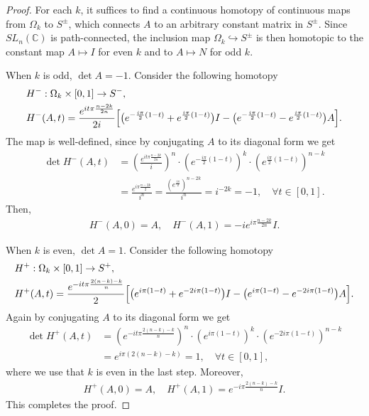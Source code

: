 \documentclass{amsart}
\newcommand{\C}{\mathbb{C}}
\theoremstyle{definition}
\begin{document}
\begin{proof}
For each $k$, it suffices to find a continuous homotopy of continuous maps from $\Omega_k$ to $S^\pm$, which connects $A$ to an arbitrary constant matrix in $S^\pm$. Since $SL_n(\C)$ is path-connected, the inclusion map $\Omega_k \hookrightarrow S^\pm$ is then homotopic to the constant map $A \mapsto I$ for even $k$ and to $A \mapsto N$ for odd $k$. 

When $k$ is odd, $\det A=-1$. Consider the following homotopy 
\begin{align*}
    &H^-: \Omega_k \times [0,1] \to S^-, \\
    &  H^-(A,t) 
    =\frac{e^{it\pi \frac{n-2k}{2n}}}{2i} \Bigl[
    \bigl(e^{-\frac{i\pi}{2}(1-t)}+e^{\frac{i\pi}{2}(1-t)}\bigr) I
    -\bigl(e^{-\frac{i\pi}{2}(1-t)}-e^{\frac{i\pi}{2}(1-t)} \bigr) A
    \Bigr].
\end{align*}
The map is well-defined, since by conjugating $A$ to its diagonal form we get
\begin{align*}
    \det H^-(A, t) &= \left(\frac{e^{it\pi \frac{n-2k}{2n}}}{i} \right)^n \cdot 
    \left( e^{-\frac{i\pi}{2}(1-t)} \right)^k  \cdot
    \left( e^{\frac{i\pi}{2}(1-t)} \right)^{n-k} \\
    &= \frac{e^{i\pi \frac{n-2k}{2}}}{i^n} =  \frac{ \left( e^{ \frac{i\pi}{2}} \right)^{n-2k}}{i^n} = i^{-2k}=-1, \quad \forall t \in [0,1]. 
\end{align*}
Then, 
\begin{align*}
    H^-(A, 0) = A, \quad
    H^-(A, 1) = -i e^{i\pi \frac{n-2k}{2n}} I.
\end{align*}


When $k$ is even, $\det A = 1$. Consider the following homotopy 
\begin{align*}
    &H^+ : \Omega_k \times [0,1] \to S^+, \\
    &  H^+(A,t) = \frac{ e^{-it \pi \frac{2(n-k)-k}{n}}}{2} \Bigl[
    \bigl(e^{i\pi(1-t)}+e^{-2i\pi(1-t)}\bigr)I
    -\bigl(e^{i\pi(1-t)}-e^{-2i\pi(1-t)}\bigr)A
    \Bigr].
\end{align*}
Again by conjugating $A$ to its diagonal form we get 
\begin{align*}
    \det H^+(A, t) &= \left( e^{-it \pi \frac{2(n-k)-k}{n}} \right)^n \cdot 
    \left( e^{i\pi(1-t)} \right)^k  \cdot
    \left( e^{-2i\pi(1-t)} \right)^{n-k} \\
    &= e^{i \pi (2(n-k)-k)} =1, \quad \forall t \in [0,1], 
\end{align*}
where we use that $k$ is even in the last step. Moreover, 
\begin{align*}
    H^+(A, 0) = A, \quad H^+(A, 1) = e^{-i \pi \frac{2(n-k)-k}{n}} I. 
\end{align*}
This completes the proof. 
    \end{proof}
\end{document}

